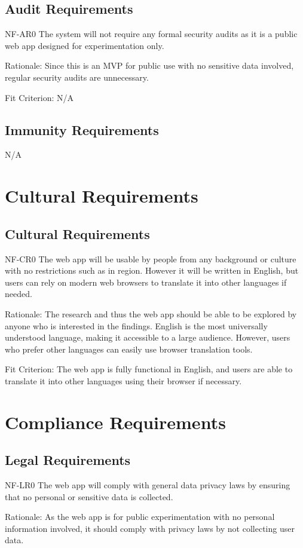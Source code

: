\documentclass[12pt]{article}
\begin{document}
\subsection{Audit Requirements}
NF-AR0 The system will not require any formal security audits as it is a public web app designed 
for experimentation only.

Rationale: Since this is an MVP for public use with no sensitive data involved, regular security 
audits are unnecessary.

Fit Criterion: N/A

\subsection{Immunity Requirements}
N/A

\section{Cultural Requirements}
\subsection{Cultural Requirements}
NF-CR0 The web app will be usable by people from any background or culture with no restrictions 
such as in region. However it will be written in English, but users can rely on modern web 
browsers to translate it into other languages if needed.

Rationale: The research and thus the web app should be able to be explored by anyone who is 
interested in the findings. English is the most universally understood language, making it 
accessible to a large audience. However, users who prefer other languages can easily use browser 
translation tools.

Fit Criterion: The web app is fully functional in English, and users are able to translate it into 
other languages using their browser if necessary.


\section{Compliance Requirements}
\subsection{Legal Requirements}
NF-LR0 The web app will comply with general data privacy laws by ensuring that no personal or 
sensitive data is collected.

Rationale: As the web app is for public experimentation with no personal information involved, it 
should comply with privacy laws by not collecting user data.
\end{document}
